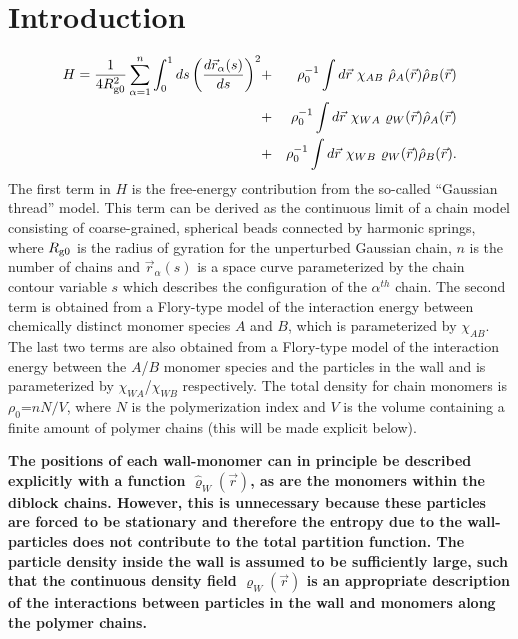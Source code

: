 \documentclass[onecolumn,amsmath,amssymb,floatfix]{elsart}
\begin{document}
\section{Introduction}
\label{sec_intro}



%
 \begin{eqnarray}
 H =
  \frac{1}{4 R_{{\rm g}0}^2 } \sum^{n}_{\alpha = 1}
           \int_0^1 ds \left ( \frac{ d {\vec r}_{\alpha}(s)}{ds} \right )^{2} 
 \nonumber
 & + & \rho_0^{-1} \int d{\vec r} \ \chi_{AB} \ {\hat \rho_A}({\vec r}) {\hat \rho_B}({\vec r}) \\
 & + & \rho_0^{-1} \int d{\vec r} \ \chi_{WA} \    \varrho_W ({\vec r}) {\hat \rho_A}({\vec r}) \\
 \nonumber
 & + & \rho_0^{-1} \int d{\vec r} \ \chi_{WB} \    \varrho_W ({\vec r}) {\hat \rho_B}({\vec r})  .
 \end{eqnarray}
%
The first term in $H$ is the free-energy contribution from
the so-called ``Gaussian thread'' \cite{doi_book} model.
This term can be
derived as the continuous limit of a chain model consisting of
coarse-grained, spherical beads connected by harmonic springs,
where $R_{{\rm g}0}$ is the radius of gyration for the unperturbed
Gaussian chain, $n$ is the number of chains and ${\vec
r}_{\alpha}(s)$ is a space curve parameterized by the chain
contour variable $s$ which describes the configuration of the
$\alpha^{th}$ chain.
The second term is obtained from a Flory-type
model of the interaction energy between chemically distinct
monomer species $A$ and $B$, which is parameterized by $\chi_{AB}$.
The last two terms are also obtained from a Flory-type
model of the interaction energy between the $A$/$B$ monomer species
and the particles in the wall and is parameterized by $\chi_{WA}$/$\chi_{WB}$
respectively.
The total density for chain monomers is $\rho_0$=$n N/V$, where $N$ is the
polymerization index and $V$ is the volume containing a finite amount
of polymer chains (this will be made explicit below).

{\bf
The positions of each wall-monomer can in principle be
described explicitly with a function ${\hat \varrho_W} ({\vec r})$,
as are the monomers within the diblock chains.
However, this is unnecessary because these particles
are forced to be stationary and therefore the entropy due
to the wall-particles does not contribute to the total partition function.
The particle density inside the wall is assumed to be sufficiently large,
such that the continuous density field $\varrho_W ({\vec r})$ is an appropriate
description of the interactions between particles in the wall and monomers
along the polymer chains.
}
\end{document}
